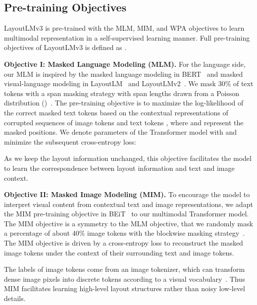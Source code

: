 \documentclass[sigconf]{acmart}
\begin{document}
\subsection{Pre-training Objectives}
LayoutLMv3 is pre-trained with the MLM, MIM, and WPA objectives to learn multimodal representation in a self-supervised learning manner.
Full pre-training objectives of LayoutLMv3 is defined as .


\noindent \textbf{Objective I: Masked Language Modeling (MLM).}
For the language side, our MLM is inspired by the masked language modeling in BERT~\cite{devlin2019bert} and masked visual-language modeling in LayoutLM~\cite{xu2020layoutlm} and LayoutLMv2~\cite{xu-etal-2021-layoutlmv2}.
We mask 30\% of text tokens with a span masking strategy with span lengths drawn from a Poisson distribution ()~\cite{lewis2020bart,joshi2020spanbert}.
The pre-training objective is to maximize the log-likelihood of the correct masked text tokens  based on the contextual representations of corrupted sequences of image tokens  and text tokens , where  and  represent the masked positions.
We denote parameters of the Transformer model with  and minimize the subsequent cross-entropy loss:

As we keep the layout information unchanged, this objective facilitates the model to learn the correspondence between layout information and text and image context.


\noindent \textbf{Objective II: Masked Image Modeling (MIM).}
To encourage the model to interpret visual content from contextual text and image representations, we adapt the MIM pre-training objective in BEiT~\cite{bao2022beit} to our multimodal Transformer model.
The MIM objective is a symmetry to the MLM objective, that we randomly mask a percentage of about 40\% image tokens with the blockwise masking strategy~\cite{bao2022beit}.
The MIM objective is driven by a cross-entropy loss to reconstruct the masked image tokens  under the context of their surrounding text and image tokens.

The labels of image tokens come from an image tokenizer, which can transform dense image pixels into discrete tokens according to a visual vocabulary~\cite{ramesh2021zero}.
Thus MIM facilitates learning high-level layout structures rather than noisy low-level details.
\end{document}
